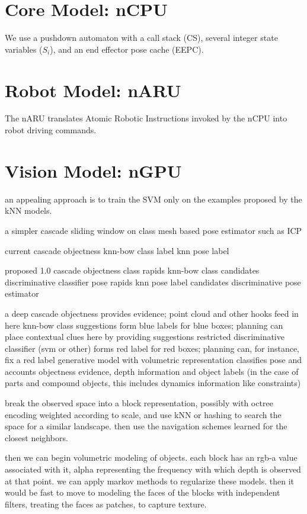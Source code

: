 \documentclass[conference]{IEEEtran}
\begin{document}
\section{Core Model: nCPU}
We use a pushdown automaton with a call stack (CS), several 
integer state variables ($S_i$), and an end effector pose cache (EEPC).


\section{Robot Model: nARU}
The nARU translates Atomic Robotic Instructions invoked by the nCPU 
into robot driving commands.


\section{Vision Model: nGPU}
an appealing approach is to train the SVM only on the examples proposed by the kNN models.

a simpler cascade
sliding window on class
mesh based pose estimator such as ICP

current cascade
objectness
knn-bow class label
knn pose label


proposed 1.0 cascade
objectness
class rapids
knn-bow class candidates
discriminative classifier
pose rapids
knn pose label candidates
discriminative pose estimator

a deep cascade
objectness provides evidence; point cloud and other hooks feed in here
knn-bow class suggestions form blue labels for blue boxes; planning can 
place contextual clues here by providing suggestions
restricted discriminative classifier (svm or other) forms red label for 
red boxes; planning can, for instance, fix a red label 
generative model with volumetric representation classifies pose and accounts 
objectness evidence, depth information and object labels (in the case of parts 
and compound objects, this includes dynamics information like constraints)

break the observed space into a block representation, possibly with octree encoding weighted 
according to scale, and use kNN or hashing to search the space for a similar landscape. then 
use the navigation schemes learned for the closest neighbors. 

then we can begin volumetric modeling of objects. each block has an rgb-a value associated 
with it, alpha representing the frequency with which depth is observed at that point.
we can apply markov methods to regularize these models. then it would be fast to move to 
modeling the faces of the blocks with independent filters, treating the faces as patches, to capture texture.
    
\end{document}
